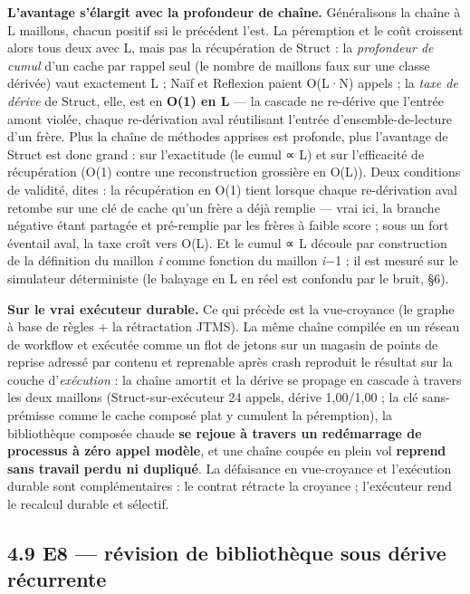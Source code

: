 \documentclass[11pt]{article}
\begin{document}
\textbf{L'avantage s'élargit avec la profondeur de chaîne.} Généralisons la chaîne à L maillons, chacun positif ssi le précédent l'est. La péremption et le coût croissent alors tous deux avec L, mais pas la récupération de Struct : la \emph{profondeur de cumul} d'un cache par rappel seul (le nombre de maillons faux sur une classe dérivée) vaut exactement L ; Naïf et Reflexion paient O(L·N) appels ; la \emph{taxe de dérive} de Struct, elle, est en \textbf{O(1) en L} — la cascade ne re-dérive que l'entrée amont violée, chaque re-dérivation aval réutilisant l'entrée d'ensemble-de-lecture d'un frère. Plus la chaîne de méthodes apprises est profonde, plus l'avantage de Struct est donc grand : sur l'exactitude (le cumul ∝ L) et sur l'efficacité de récupération (O(1) contre une reconstruction grossière en O(L)). Deux conditions de validité, dites : la récupération en O(1) tient lorsque chaque re-dérivation aval retombe sur une clé de cache qu'un frère a déjà remplie — vrai ici, la branche négative étant partagée et pré-remplie par les frères à faible score ; sous un fort éventail aval, la taxe croît vers O(L). Et le cumul ∝ L découle par construction de la définition du maillon \emph{i} comme fonction du maillon \emph{i}−1 ; il est mesuré sur le simulateur déterministe (le balayage en L en réel est confondu par le bruit, §6).

\textbf{Sur le vrai exécuteur durable.} Ce qui précède est la vue-croyance (le graphe à base de règles + la rétractation JTMS). La même chaîne compilée en un réseau de workflow et exécutée comme un flot de jetons sur un magasin de points de reprise adressé par contenu et reprenable après crash reproduit le résultat sur la couche d'\emph{exécution} : la chaîne amortit et la dérive se propage en cascade à travers les deux maillons (Struct-sur-exécuteur 24 appels, dérive 1,00/1,00 ; la clé sans-prémisse comme le cache composé plat y cumulent la péremption), la bibliothèque composée chaude \textbf{se rejoue à travers un redémarrage de processus à zéro appel modèle}, et une chaîne coupée en plein vol \textbf{reprend sans travail perdu ni dupliqué}. La défaisance en vue-croyance et l'exécution durable sont complémentaires : le contrat rétracte la croyance ; l'exécuteur rend le recalcul durable et sélectif.

\subsection*{4.9 E8 — révision de bibliothèque sous dérive récurrente}
\end{document}
